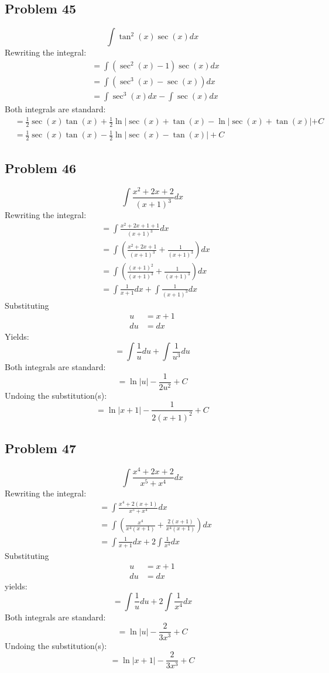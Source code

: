\documentclass{article}
\begin{document}
\subsection*{Problem 45}
$$\int\tan^2\left(x\right)\sec\left(x\right)dx$$
Rewriting the integral:
\begin{align*}
&=\int(\sec^2(x)-1)\sec(x)dx \\
&=\int(\sec^3(x)-\sec(x))dx \\
&=\int\sec^3(x)dx-\int\sec(x)dx
\end{align*}
Both integrals are standard:
\begin{align*}
&=\frac{1}{2}\sec(x)\tan(x)+\frac{1}{2}\ln|\sec(x)+\tan(x)-\ln|\sec(x)+\tan(x)|+C \\
&=\frac{1}{2}\sec(x)\tan(x)-\frac{1}{2}\ln|\sec(x)-\tan(x)|+C
\end{align*}
\subsection*{Problem 46}
$$\int\frac{x^2+2x+2}{\left(x+1\right)^3}dx$$
Rewriting the integral:
\begin{align*}
&=\int\frac{x^2+2x+1+1}{(x+1)^3}dx \\
&=\int\left(\frac{x^2+2x+1}{(x+1)^3}+\frac{1}{(x+1)^3}\right)dx \\
&=\int\left(\frac{(x+1)^2}{(x+1)^3}+\frac{1}{(x+1)^3}\right)dx \\
&=\int\frac{1}{x+1}dx+\int\frac{1}{(x+1)^3}dx
\end{align*}
Substituting
\begin{align*}
u&=x+1 \\
du&=dx
\end{align*}
Yields:
$$=\int\frac{1}{u}du+\int\frac{1}{u^3}du$$
Both integrals are standard:
$$=\ln|u|-\frac{1}{2u^2}+C$$
Undoing the substitution(s):
$$=\ln|x+1|-\frac{1}{2(x+1)^2}+C$$
\subsection*{Problem 47}
$$\int\frac{x^4+2x+2}{x^5+x^4}dx$$
Rewriting the integral:
\begin{align*}
&=\int\frac{x^4+2(x+1)}{x^5+x^4}dx \\
&=\int\left(\frac{x^4}{x^4(x+1)}+\frac{2(x+1)}{x^4(x+1)}\right)dx \\
&=\int\frac{1}{x+1}dx+2\int\frac{1}{x^4}dx
\end{align*}
Substituting
\begin{align*}
u&=x+1 \\
du&=dx
\end{align*}
yields:
$$=\int\frac{1}{u}du+2\int\frac{1}{x^4}dx$$
Both integrals are standard:
$$=\ln|u|-\frac{2}{3x^3}+C$$
Undoing the substitution(s):
$$=\ln|x+1|-\frac{2}{3x^3}+C$$
\end{document}
